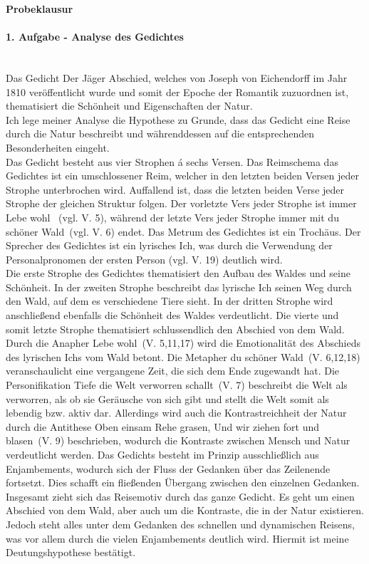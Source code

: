\documentclass[12pt,a4paper]{report}
\begin{document}
	\centering
	\LARGE
	\textbf{Probeklausur}
	\normalsize
	\leftskip
	
	\paragraph{1. Aufgabe - Analyse des Gedichtes} \mbox{} \\
	Das Gedicht \dq Der Jäger Abschied\dq, welches von Joseph von Eichendorff im Jahr 1810 veröffentlicht wurde und somit der Epoche der Romantik zuzuordnen ist, thematisiert die Schönheit und Eigenschaften der Natur. \\
	Ich lege meiner Analyse die Hypothese zu Grunde, dass das Gedicht eine Reise durch die Natur beschreibt und währenddessen auf die entsprechenden Besonderheiten eingeht. \\
	Das Gedicht besteht aus vier Strophen á sechs Versen.
	Das Reimschema das Gedichtes ist ein umschlossener Reim, welcher in den letzten beiden Versen jeder Strophe unterbrochen wird.
	Auffallend ist, dass die letzten beiden Verse jeder Strophe der gleichen Struktur folgen.
	Der vorletzte Vers jeder Strophe ist immer \dq Lebe wohl \dq\ (vgl. V. 5), während der letzte Vers jeder Strophe immer mit \dq du schöner Wald\dq\ (vgl. V. 6) endet.
	Das Metrum des Gedichtes ist ein Trochäus.
	Der Sprecher des Gedichtes ist ein lyrisches Ich, was durch die Verwendung der Personalpronomen der ersten Person (vgl. V. 19)  deutlich wird. \\
	Die erste Strophe des Gedichtes thematisiert den Aufbau des Waldes und seine Schönheit.
	In der zweiten Strophe beschreibt das lyrische Ich seinen Weg durch den Wald, auf dem es verschiedene Tiere sieht.
	In der dritten Strophe wird anschließend ebenfalls die Schönheit des Waldes verdeutlicht.
	Die vierte und somit letzte Strophe thematisiert schlussendlich den Abschied von dem Wald. \\
	Durch die Anapher \dq Lebe wohl\dq\ (V. 5,11,17) wird die Emotionalität des Abschieds des lyrischen Ichs vom Wald betont.
	Die Metapher \dq du schöner Wald\dq\ (V. 6,12,18) veranschaulicht eine vergangene Zeit, die sich dem Ende zugewandt hat.
	Die Personifikation \dq Tiefe die Welt verworren schallt\dq\ (V. 7) beschreibt die Welt als verworren, als ob sie Geräusche von sich gibt und stellt die Welt somit als lebendig bzw. aktiv dar.
	Allerdings wird auch die Kontrastreichheit der Natur durch die Antithese \dq Oben einsam Rehe grasen, Und wir ziehen fort und blasen\dq\ (V. 9) beschrieben, wodurch die Kontraste zwischen Mensch und Natur verdeutlicht werden.
	Das Gedichts besteht im Prinzip ausschließlich aus Enjambements, wodurch sich der Fluss der Gedanken über das Zeilenende fortsetzt.
	Dies schafft ein fließenden Übergang zwischen den einzelnen Gedanken. \\
	Insgesamt zieht sich das Reisemotiv durch das ganze Gedicht.
	Es geht um einen Abschied von dem Wald, aber auch um die Kontraste, die in der Natur existieren.
	Jedoch steht alles unter dem Gedanken des schnellen und dynamischen Reisens, was vor allem durch die vielen Enjambements deutlich wird.
	Hiermit ist meine Deutungshypothese bestätigt.
	
\end{document}
